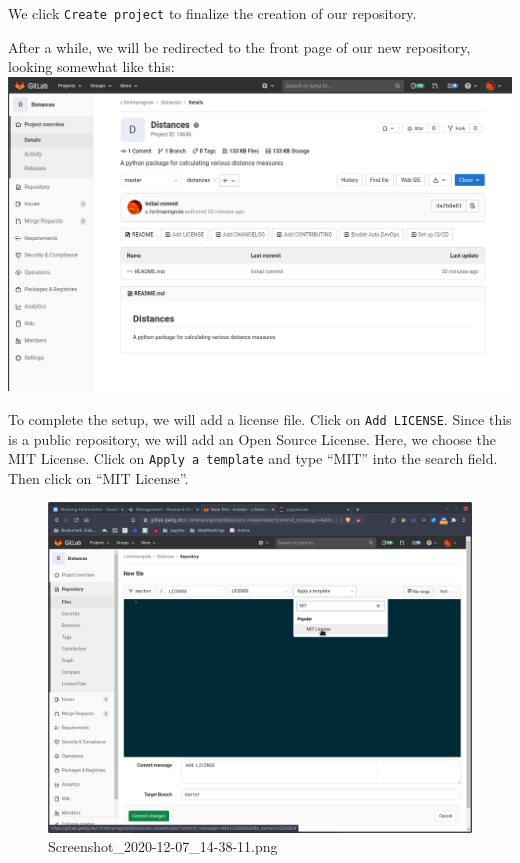 \documentclass[11pt]{article}
\begin{document}
    We click \texttt{Create\ project} to finalize the creation of our
repository.

After a while, we will be redirected to the front page of our new
repository, looking somewhat like this:
\includegraphics{static/repo_created.png}

To complete the setup, we will add a license file. Click on
\texttt{Add\ LICENSE}. Since this is a public repository, we will add an
Open Source License. Here, we choose the MIT License. Click on
\texttt{Apply\ a\ template} and type ``MIT'' into the search field. Then
click on ``MIT License''.

\begin{figure}
\centering
\includegraphics{static/license.png}
\caption{Screenshot\_2020-12-07\_14-38-11.png}
\end{figure}
\end{document}
